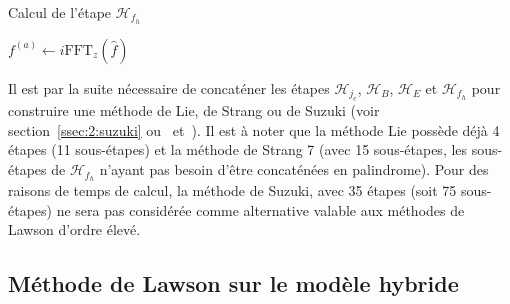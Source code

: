 \begin{algorithm}
  \caption{Calcul de l'étape $\mathcal{H}_{f_h}$}
  \label{alg:Hfh}
  \begin{algorithmic}[1]
      \State $f^{(a)} \gets i\text{FFT}_z(\hat{f})$
      \State {}
      \State {}
      \State {}
    \EndFunction
  \end{algorithmic}
\end{algorithm}

Il est par la suite nécessaire de concaténer les étapes $\mathcal{H}_{j_c}$, $\mathcal{H}_{B}$, $\mathcal{H}_{E}$ et $\mathcal{H}_{f_h}$ pour construire une méthode de Lie, de Strang ou de Suzuki (voir section~\ref{ssec:2:suzuki} ou~\cite{Suzuki:1990} et~\cite{Blanes:2019}). Il est à noter que la méthode Lie possède déjà 4 étapes (11 sous-étapes) et la méthode de Strang 7 (avec 15 sous-étapes, les sous-étapes de $\mathcal{H}_{f_h}$ n'ayant pas besoin d'être concaténées en palindrome). Pour des raisons de temps de calcul, la méthode de Suzuki, avec 35 étapes (soit 75 sous-étapes) ne sera pas considérée comme alternative valable aux méthodes de Lawson d'ordre élevé.



\FloatBarrier
\subsection{Méthode de Lawson sur le modèle hybride}


